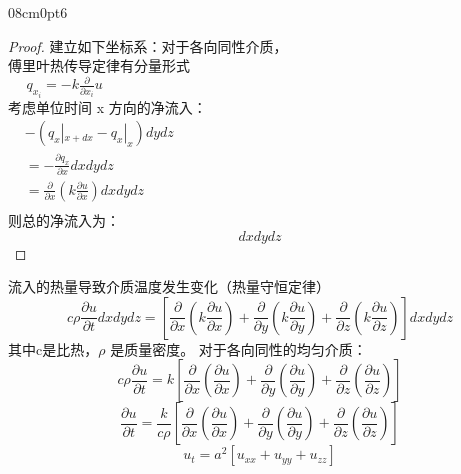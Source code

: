 \begin{cutout} {0}{8cm}{0pt}{6}
\begin{proof} 
建立如下坐标系：对于各向同性介质，\\
傅里叶热传导定律有分量形式 \\
	$~~~~~~q_{x_i}=-k \frac{\partial }{\partial x_{i}} u$ \\
考虑单位时间 x 方向的净流入：\\
  $\displaystyle \begin{array}{llll}
	&- (q_x|_{x+dx}-q_x|_x)dydz\\
	&=-\frac{\partial q_x }{\partial x}  dxdydz\\
	&= \frac{\partial }{\partial x} (k\frac{\partial u}{\partial x})dxdydz \\
\end{array}$ \\   
则总的净流入为：
\begin{equation*}
	[\frac{\partial }{\partial x} (k\frac{\partial u}{\partial x}) + \frac{\partial }{\partial y} (k\frac{\partial u}{\partial y}) + \frac{\partial }{\partial z} (k\frac{\partial u}{\partial z}) ]dxdydz 
\end{equation*}
\end{proof}
\end{cutout} 	
流入的热量导致介质温度发生变化（热量守恒定律）\\
\begin{equation*}
	c \rho \frac{\partial u}{\partial t}dxdydz=[\frac{\partial }{\partial x} (k\frac{\partial u}{\partial x}) + \frac{\partial }{\partial y} (k\frac{\partial u}{\partial y}) + \frac{\partial }{\partial z} (k\frac{\partial u}{\partial z}) ]dxdydz 
	\end{equation*}
其中c是比热，$\rho$ 是质量密度。 对于各向同性的均匀介质：
\begin{equation*}
	c \rho \frac{\partial u }{\partial t}=k[\frac{\partial }{\partial x} (\frac{\partial u}{\partial x}) + \frac{\partial }{\partial y} (\frac{\partial u}{\partial y}) + \frac{\partial }{\partial z} (\frac{\partial u}{\partial z}) ]	
\end{equation*}
\begin{equation*}
 \frac{\partial u }{\partial t}=\frac{k}{c\rho}[\frac{\partial }{\partial x} (\frac{\partial u}{\partial x}) + \frac{\partial }{\partial y} (\frac{\partial u}{\partial y}) + \frac{\partial }{\partial z} (\frac{\partial u}{\partial z}) ]	
\end{equation*}
\begin{equation*}
	u_t=a^2 [u_{xx}   +u_{yy}  +u_{zz}] 
\end{equation*}
